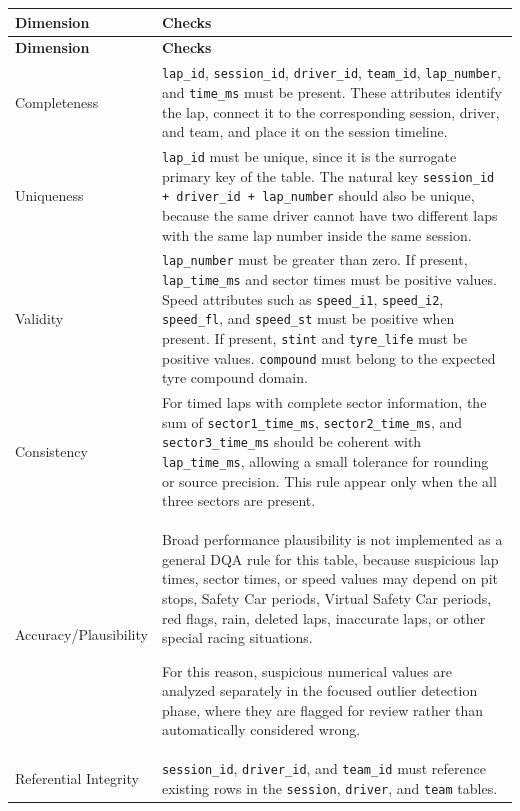 \documentclass[a4paper,11pt]{article}
\begin{document}
	\begin{longtable}{p{3.5cm}p{11cm}}
		\toprule
		\textbf{Dimension} & \textbf{Checks} \\
		\midrule
		\endfirsthead
		
		\toprule
		\textbf{Dimension} & \textbf{Checks} \\
		\midrule
		\endhead
		
		Completeness
		& \texttt{lap\_id}, \texttt{session\_id}, \texttt{driver\_id},
		\texttt{team\_id}, \texttt{lap\_number}, and \texttt{time\_ms}
		must be present. These attributes identify the lap, connect it to the
		corresponding session, driver, and team, and place it on the session timeline. \\
		\midrule
		
		Uniqueness
		& \texttt{lap\_id} must be unique, since it is the surrogate primary key of
		the table. The natural key \texttt{session\_id + driver\_id + lap\_number}
		should also be unique, because the same driver cannot have two different laps
		with the same lap number inside the same session. \\
		\midrule
		
		Validity
		& \texttt{lap\_number} must be greater than zero. If present,
		\texttt{lap\_time\_ms} and sector times must be positive values.
		Speed attributes such as \texttt{speed\_i1}, \texttt{speed\_i2},
		\texttt{speed\_fl}, and \texttt{speed\_st} must be positive when present.
		If present, \texttt{stint} and \texttt{tyre\_life} must be positive values.
		\texttt{compound} must belong to the expected tyre compound domain. \\
		\midrule
		
		Consistency
		& For timed laps with complete sector information, the sum of
		\texttt{sector1\_time\_ms}, \texttt{sector2\_time\_ms}, and
		\texttt{sector3\_time\_ms} should be coherent with
		\texttt{lap\_time\_ms}, allowing a small tolerance for rounding or source
		precision. This rule appear only when the all three sectors are present. \\
		\midrule
		
		Accuracy/Plausibility
		& Broad performance plausibility is not implemented as a general DQA rule for
		this table, because suspicious lap times, sector times, or speed values may
		depend on pit stops, Safety Car periods, Virtual Safety Car periods, red flags,
		rain, deleted laps, inaccurate laps, or other special racing situations.
		
		For this reason, suspicious numerical values are analyzed separately in the
		focused outlier detection phase, where they are flagged for review rather than
		automatically considered wrong. \\
		\midrule
		
		Referential Integrity
		& \texttt{session\_id}, \texttt{driver\_id}, and \texttt{team\_id} must
		reference existing rows in the \texttt{session}, \texttt{driver}, and
		\texttt{team} tables. \\
		\bottomrule
	\end{longtable}
\end{document}
